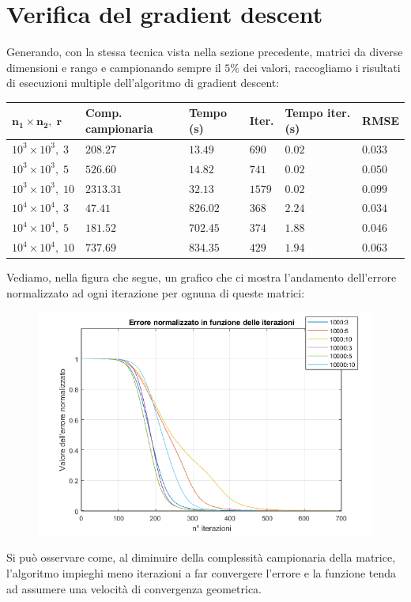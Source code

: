 \documentclass[12pt,a4paper]{report}
\begin{document}
\section{Verifica del gradient descent}

Generando, con la stessa tecnica vista nella sezione precedente,
matrici da diverse dimensioni e rango
e campionando sempre il $5\%$ dei valori, raccogliamo i risultati
di esecuzioni multiple dell'algoritmo di gradient descent:
\begin{table}[H]
  \centering
  \begin{tabular}{@{}llllll@{}}
  \toprule
  \textbf{$\boldsymbol{n_1 \times n_2, \; r}$} & \textbf{Comp. campionaria} & \textbf{Tempo (s)} & \textbf{Iter.} & \textbf{Tempo iter. (s)} & \textbf{RMSE} \\ \midrule
  $10^3 \times 10^3, \; 3$  & $208.27$  & $13.49$   & $690$     & $0.02$     & $0.033$     \\ \midrule
  $10^3 \times 10^3, \; 5$  & $526.60$  & $14.82$   & $741$     & $0.02$     & $0.050$     \\ \midrule
  $10^3 \times 10^3, \; 10$ & $2313.31$ & $32.13$   & $1579$    & $0.02$     & $0.099$     \\ \midrule
  $10^4 \times 10^4, \; 3$  & $47.41$   & $826.02$  & $368$     & $2.24$     & $0.034$     \\ \midrule
  $10^4 \times 10^4, \; 5$  & $181.52$  & $702.45$  & $374$     & $1.88$     & $0.046$     \\ \midrule
  $10^4 \times 10^4, \; 10$ & $737.69$  & $834.35$  & $429$     & $1.94$     & $0.063$     \\ \bottomrule
  \end{tabular}
\end{table}

Vediamo, nella figura che segue, un grafico che ci mostra l'andamento dell'errore normalizzato
ad ogni iterazione per ognuna di queste matrici:
\begin{figure}[H]
  \centering
  \includegraphics[width=.75\textwidth]{Figures/errors}
\end{figure}
Si può osservare come, al diminuire della complessità campionaria della matrice,
l'algoritmo impieghi meno iterazioni a far convergere l'errore e la funzione
tenda ad assumere una velocità di convergenza geometrica.




\printbibliography

\cleardoublepage{} %
\end{document}
